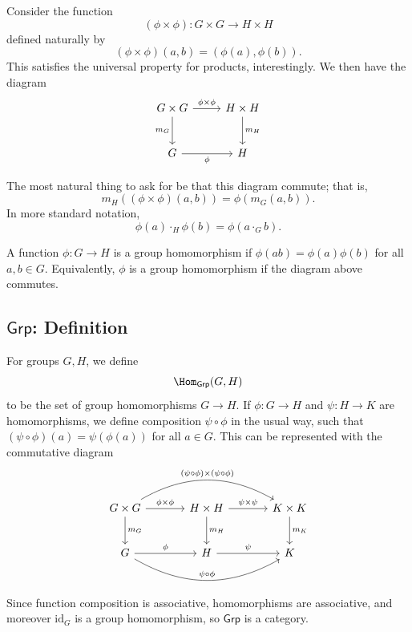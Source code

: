 Consider the function
\[
	(\phi \times \phi ): G\times G \to H\times H
\]
defined naturally by
\[
	(\phi \times \phi )(a,b)=(\phi (a),\phi (b))
.\]
This satisfies the universal property for products, interestingly. We then have the diagram
\[\begin{tikzcd}[row sep=2.5em, column sep=2.5em]
	G\times G\arrow[r,"\phi \times \phi "]\arrow[d,"m_G"']&H\times H\arrow[d, "m_H"]\\
	G\arrow[r, "\phi "']&H
\end{tikzcd}\]

The most natural thing to ask for be that this diagram commute; that is,
\[
	m_H((\phi \times \phi )(a,b))=\phi (m_G(a,b))
.\]
In more standard notation,
\[
	\phi (a) \cdot_H \phi (b)=\phi (a\cdot_G b)
.\]
\begin{definition}\label{dfn:3.1}
	A function $\phi : G \to H$ is a group homomorphism if $\phi (ab)=\phi (a)\phi (b)$ for all $a,b\in G$. Equivalently, $\phi $ is a group homomorphism if the diagram above commutes.
\end{definition}
\subsection{$\mathsf{Grp}$: Definition}
For groups $G,H$, we define
\[
	\Hom_{\mathsf{Grp}}(G , H)
\]
to be the set of group homomorphisms $G\to H$. If $\phi : G \to H$ and $\psi : H \to K$ are homomorphisms, we define composition $\psi \circ \phi $ in the usual way, such that $(\psi \circ \phi )(a)=\psi (\phi (a))$ for all $a\in G$. This can be represented with the commutative diagram
\[\begin{tikzcd}[row sep=2.5em, column sep=3.5em]
	G\times G\arrow[r, "\phi \times \phi "]\arrow[rr, bend left, "(\psi \circ \phi )\times (\psi \circ \phi )"]\arrow[d, "m_G"]&H\times H\arrow[r, "\psi \times \psi "]\arrow[d, "m_H"]&K\times K\arrow[d, "m_K"]\\
	G\arrow[r, "\phi "]\arrow[rr, bend right, "\psi \circ \phi "]&H\arrow[r, "\psi" ]&K
\end{tikzcd}\]
Since function composition is associative, homomorphisms are associative, and moreover $\mathrm{id}_G$ is a group homomorphism, so $\mathsf{Grp}$ is a category.
